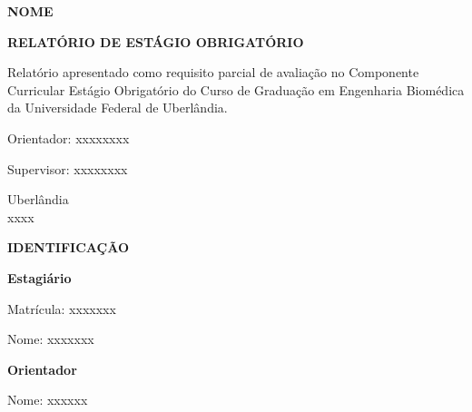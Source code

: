 \documentclass[12pt]{article}
\begin{document}
\begin{titlepage}
    \centering
    \vspace*{3cm}

    \textbf{\Large NOME}

    \vfill

    \textbf{RELATÓRIO DE ESTÁGIO OBRIGATÓRIO}

    \vspace{3.5cm}

    \justifying
    \begin{flushright}
        \begin{minipage}{0.6\textwidth}
        Relatório apresentado como requisito parcial de \hspace{1cm} avaliação no Componente Curricular Estágio Obrigatório do Curso de Graduação em Engenharia Biomédica da Universidade Federal de Uberlândia.
        
        \vspace{1cm}
        
        Orientador: xxxxxxxx

        \vspace{1cm}
        
        Supervisor: xxxxxxxx

        \end{minipage}
  \end{flushright}

    \vfill
    \begin{center}
           Uberlândia \\
        xxxx
    \end{center}


\end{titlepage}

\newpage

\begin{center}
    \textbf{IDENTIFICAÇÃO}
\end{center}

\vspace{1cm}

\textbf{Estagiário}

\hspace{1.1cm} Matrícula: xxxxxxx

\hspace{1.1cm} Nome: xxxxxxx

\vspace{1.6cm}

\textbf{Orientador}

\hspace{1.1cm} Nome: xxxxxx
\end{document}
